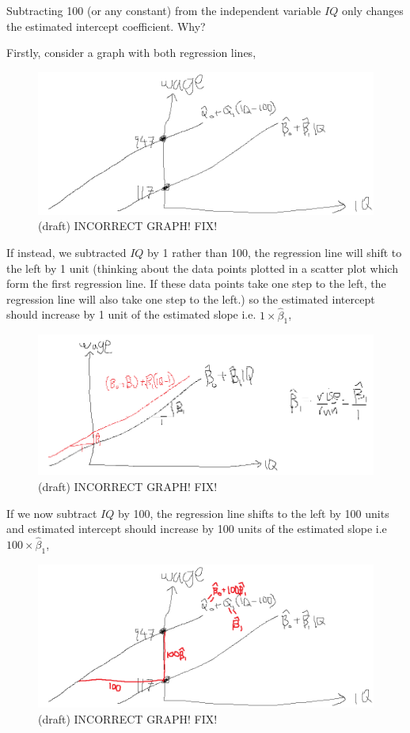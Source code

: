 \documentclass[12pt]{report}
\begin{document}
\noindent Subtracting 100 (or any constant) from the independent variable $IQ$ only changes the estimated intercept coefficient. Why?

\noindent Firstly, consider a graph with both regression lines,
\begin{figure}[H]
	\centerline{\includegraphics{q3_29}}
	\caption{(draft) INCORRECT GRAPH! FIX!}
\end{figure}
\noindent If instead, we subtracted $IQ$ by 1 rather than 100, the regression line will shift to the left by 1 unit (thinking about the data points plotted in a scatter plot which form the first regression line. If these data points take one step to the left, the regression line will also take one step to the left.) so the estimated intercept should increase by 1 unit of the estimated slope i.e. $1\times\hat{\beta}_1$,
\begin{figure}[H]
	\centerline{\includegraphics{q3_30}}
	\caption{(draft) INCORRECT GRAPH! FIX!}
\end{figure}
\noindent If we now subtract $IQ$ by 100, the regression line shifts to the left by 100 units and estimated intercept should increase by 100 units of the estimated slope i.e $100\times\hat{\beta}_1$,
\begin{figure}[H]
	\centerline{\includegraphics{q3_31}}
	\caption{(draft) INCORRECT GRAPH! FIX!}
\end{figure}
\end{document}
